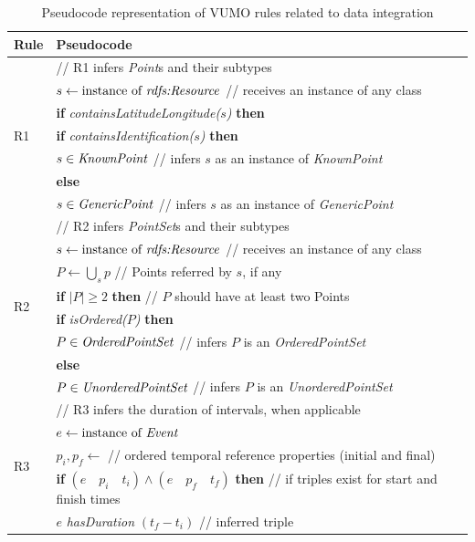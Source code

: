 \documentclass[]{interact}
\theoremstyle{plain}%
\theoremstyle{definition}
\theoremstyle{remark}
\theoremstyle{definition}
\begin{document}
\begin{tiny}
\begin{table}[htbp]
\caption{Pseudocode representation of VUMO rules related to data integration}
\label{tab:vumorules_dataintegration}
\centering
\begin{tabular}{p{0.5cm}l}
    \toprule
    Rule & Pseudocode\\
    \midrule

	\multirow{7}{*}{R1} & // R1 infers \textit{Point}s and their subtypes \\
	& $s \leftarrow \text{instance of \textit{rdfs:Resource}}$ // receives an instance of any class  \\
	&  \textbf{if} \textit{containsLatitudeLongitude($s$)} \textbf{then} \\
	& \quad \textbf{if} \textit{containsIdentification($s$)} \textbf{then}\\
	& \quad \quad $s \in \text{\textit{KnownPoint}}$ // infers $s$ as an instance of \textit{KnownPoint} \\
	& \quad \textbf{else} \\
	& \quad \quad $s \in \text{\textit{GenericPoint}}$ // infers $s$ as an instance of \textit{GenericPoint}\\
	\hline
	\multirow{8}{*}{R2} & // R2 infers \textit{PointSet}s and their subtypes \\
	&  $s \leftarrow \text{instance of \textit{rdfs:Resource}}$ // receives an instance of any class  \\
	& $P \leftarrow \bigcup_{s} p$ // Points referred by $s$, if any\\
	&  \textbf{if} $|P| \geq 2$  \textbf{then} // $P$ should have at least two Points \\
	& \quad \textbf{if} \textit{isOrdered($P$)} \textbf{then}\\
	& \quad \quad $P \in \text{\textit{OrderedPointSet}}$ // infers $P$ is an \textit{OrderedPointSet} \\
	& \quad \textbf{else} \\
	& \quad \quad $P \in \text{\textit{UnorderedPointSet}}$ // infers $P$ is an \textit{UnorderedPointSet} \\
	\hline
	\multirow{5}{*}{R3} & // R3 infers the duration of intervals, when applicable\\
	&  $e \leftarrow \text{instance of \textit{Event}}$ \\
	& $p_i,p_f \leftarrow$ // ordered temporal reference properties (initial and final)\\
	&\textbf{if} $(e \quad p_i \quad t_i) \wedge (e \quad p_f \quad t_f)$ \textbf{then} // if triples exist for start and finish times \\
	& \quad $e$ \textit{hasDuration} $(t_f - t_i)$ // inferred triple\\
    \bottomrule
\end{tabular}
\end{table}
\end{tiny}
\end{document}
